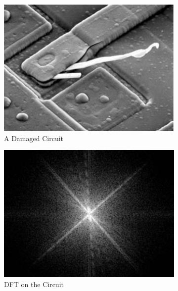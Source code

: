 \documentclass{amsproc}
\begin{document}
\begin{figure}[h]
\centering
\begin{subfigure}{.3\textwidth}
	\centering
	\includegraphics[scale=.32]{images/dftimage1.png}
	\caption{A Damaged Circuit}
	\label{fig:sub8}
\end{subfigure} %
\begin{subfigure}{.3\textwidth}
	\centering
	\includegraphics[scale=.32]{images/dftimage2.png}
	\caption{DFT on the Circuit}
	\label{fig:sub9}
\end{subfigure} %
\begin{subfigure}{.3\textwidth}
	\centering

\end{subfigure}
\end{figure}
\end{document}
